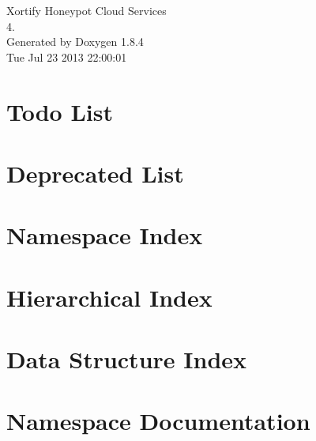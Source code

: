\documentclass[twoside]{book}
\newcommand{\clearemptydoublepage}{%
  \newpage{\pagestyle{empty}\cleardoublepage}%
}
\begin{document}
\hypersetup{pageanchor=false}
\begin{titlepage}
\vspace*{7cm}
\begin{center}%
{\Large Xortify Honeypot Cloud Services \\[1ex]\large 4. }\\
\vspace*{1cm}
{\large Generated by Doxygen 1.8.4}\\
\vspace*{0.5cm}
{\small Tue Jul 23 2013 22:00:01}\\
\end{center}
\end{titlepage}
\clearemptydoublepage
\tableofcontents
\clearemptydoublepage
{}
\hypersetup{pageanchor=true}

\chapter{Todo List}
\label{todo}
\hypertarget{todo}{}

\chapter{Deprecated List}
\label{deprecated}
\hypertarget{deprecated}{}

\chapter{Namespace Index}

\chapter{Hierarchical Index}

\chapter{Data Structure Index}

\chapter{Namespace Documentation}







\end{document}
